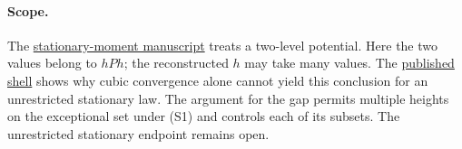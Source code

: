 \paragraph{Scope.}
The
\href{https://airr.science/papers/ARR-2026-4T35VQ6MZB8F99F4/versions/v2/}{stationary-moment manuscript}
treats a two-level potential. Here the two values belong to $hPh$;
the reconstructed $h$ may take many values. The
\href{https://airr.science/papers/ARR-2026-2B2W1WQ7DF9N5VW7/versions/v1/}{published shell}
shows why cubic convergence alone cannot yield this conclusion for an
unrestricted stationary law. The argument for the gap permits multiple
heights on the exceptional set under (S1) and controls each of its
subsets. The unrestricted stationary endpoint remains open.

